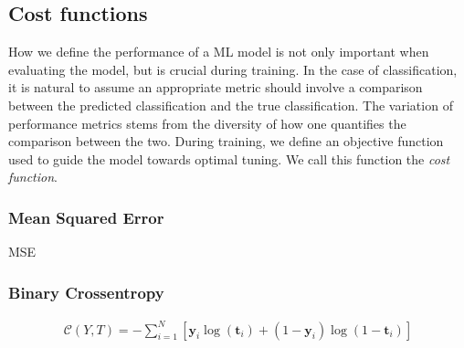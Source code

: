 \subsection{Cost functions}\label{subsec:Cost}
How we define the performance of a \ac{ML} model is not only important when 
evaluating the model, but is crucial during training. In the case of classification,
it is natural to assume an appropriate metric should involve a comparison between 
the predicted classification and the true classification. The variation of 
performance metrics stems from the diversity of how one quantifies the comparison 
between the two. During training, we define an objective function used to guide 
the model towards optimal tuning. We call this function the \emph{cost function}. 
\\
\subsubsection{Mean Squared Error}\label{subsubsec:MSE}
\ac{MSE}
\subsubsection{Binary Crossentropy}
\begin{align}
    \mathcal{C}\left(Y, T\right) =-\sum_{i=1}^N\left[ \textbf{y}_i \log \left(\textbf{t}_i\right)+\left(1-\textbf{y}_i\right) \log \left(1-\textbf{t}_i\right)\right]
\end{align}
